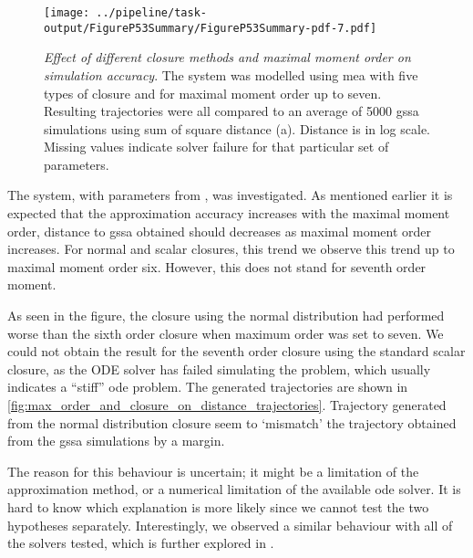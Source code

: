 \begin{figure}[t]
    \centering
    \texttt{[image: ../pipeline/task-output/FigureP53Summary/FigureP53Summary-pdf-7.pdf]}
    \caption{\emph{Effect of different closure methods and maximal moment order on simulation accuracy}. The \pft system was modelled using \gls{mea} with five types of closure and for maximal moment order up to seven.
Resulting trajectories were all compared to an average of 5000 \gls{gssa} simulations using sum of square distance (a).
Distance is in log scale. Missing values indicate solver failure for that particular set of parameters.}
    \label{fig:max_order_and_closure_on_distance_summary}
\end{figure}

The \pft{} system, with parameters from \cite{ale_general_2013}, was investigated.
As mentioned earlier it is expected that the approximation accuracy increases with the maximal moment order, \ie{} distance to \gls{gssa} obtained should decreases
 as maximal moment order increases. 
For normal and scalar closures, this trend we observe this trend up to maximal moment order six. 
However, this does not stand for seventh order moment.


As seen in the figure, the closure using the normal distribution had performed worse than the sixth order closure when maximum order was set to seven.
We could not obtain the result for the seventh order closure using the standard scalar closure, as the ODE solver has failed simulating the problem, which usually indicates a ``stiff'' \gls{ode} problem. 
The generated trajectories are shown in \autoref{fig:max_order_and_closure_on_distance_trajectories}. 
Trajectory generated from the normal distribution closure seem to `mismatch' the trajectory obtained from the \gls{gssa} simulations by a margin.

The reason for this behaviour is uncertain; it might be a limitation of the approximation method, or a numerical limitation of the available \gls{ode} solver.
It is hard to know which explanation is more likely since we cannot test the two hypotheses separately. 
Interestingly, we observed a similar behaviour with all of the solvers tested, which is further explored in .

